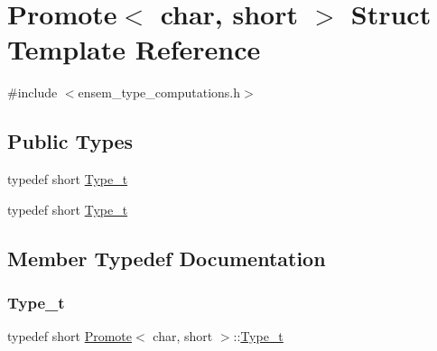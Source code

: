 \hypertarget{structPromote_3_01char_00_01short_01_4}{}\section{Promote$<$ char, short $>$ Struct Template Reference}
\label{structPromote_3_01char_00_01short_01_4}


{\ttfamily \#include $<$ensem\+\_\+type\+\_\+computations.\+h$>$}

\subsection*{Public Types}
\begin{DoxyCompactItemize}
\item 
typedef short \mbox{\hyperlink{structPromote_3_01char_00_01short_01_4_a91c7f7533624b9bf6b3e703dee62287a}{Type\+\_\+t}}
\item 
typedef short \mbox{\hyperlink{structPromote_3_01char_00_01short_01_4_a91c7f7533624b9bf6b3e703dee62287a}{Type\+\_\+t}}
\end{DoxyCompactItemize}


\subsection{Member Typedef Documentation}
\mbox{\label{structPromote_3_01char_00_01short_01_4_a91c7f7533624b9bf6b3e703dee62287a}} 
\subsubsection{\texorpdfstring{Type\_t}{Type\_t}\hspace{0.1cm}{\footnotesize\ttfamily [1/2]}}
{\footnotesize\ttfamily typedef short \mbox{\hyperlink{structPromote}{Promote}}$<$ char, short $>$\+::\mbox{\hyperlink{structPromote_3_01char_00_01short_01_4_a91c7f7533624b9bf6b3e703dee62287a}{Type\+\_\+t}}}

\mbox{\label{structPromote_3_01char_00_01short_01_4_a91c7f7533624b9bf6b3e703dee62287a}} 
